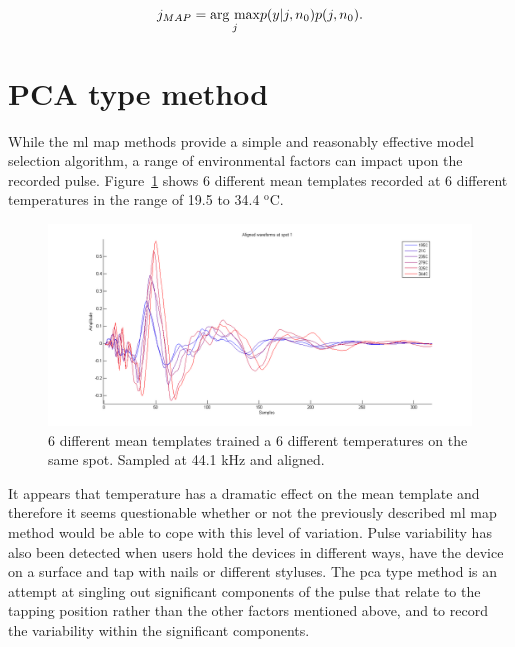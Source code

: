 \begin{equation}\label{eq:MAPdefinition}
j_{MAP} = \underset{j}{\mathrm{arg~max}} p(y|j,n_0)p(j,n_0).
\end{equation}


\section{PCA type method}\label{sec:APRpca}
While the \DIFdelbegin {}\DIFdelend \DIFaddbegin \gls{ml} \gls{map} \DIFaddend methods provide a simple and reasonably effective model selection algorithm, a range of environmental factors can impact upon the recorded pulse. Figure~\ref{fig:shiftOverTemperature} shows 6 different mean templates recorded at 6 different temperatures in the range of 19.5 to 34.4 $^\textrm{o}$C.

\begin{figure}[!]
\centering
\includegraphics[width=150mm]{shiftOverTemperature.png}
\caption{6 different mean templates trained a 6 different temperatures on the same spot. Sampled at 44.1 kHz and aligned.}\label{fig:shiftOverTemperature}
\end{figure}
It appears that temperature has a dramatic effect on the mean template and therefore it seems questionable whether or not the previously described \DIFdelbegin {}\DIFdelend \DIFaddbegin \gls{ml} \gls{map} \DIFaddend method would be able to cope with this level of variation. Pulse variability has also been detected when users hold the devices in different ways, have the device on a surface and tap with nails or different styluses. The \DIFdelbegin {}\DIFdelend \DIFaddbegin \gls{pca} \DIFaddend type method is an attempt at singling out significant components of the pulse that relate to the tapping position rather than the other factors mentioned above, and to record the variability within the significant components.

